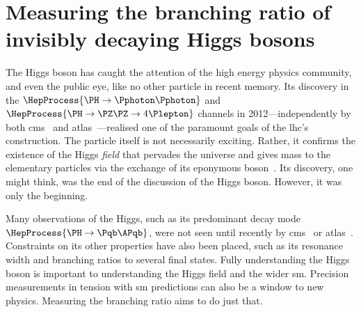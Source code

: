 \fi




\section{Measuring the branching ratio of invisibly decaying Higgs bosons}
\label{sec:theory_higgs_to_inv}

The Higgs boson has caught the attention of the high energy physics community, and even the public eye, like no other particle in recent memory. Its discovery in the $\HepProcess{\PH \to \Pphoton\Pphoton}$ and $\HepProcess{\PH \to \PZ\PZ \to \text{4}\Plepton}$ channels in 2012---independently by both \acrshort{cms}~\cite{Chatrchyan:2012xdj} and \acrshort{atlas}~\cite{Aad:2012tfa}---realised one of the paramount goals of the \acrshort{lhc}'s construction. The particle itself is not necessarily exciting. Rather, it confirms the existence of the Higgs \emph{field} that pervades the universe and gives mass to the elementary particles via the exchange of its eponymous boson~\cite{PhysRevLett.13.321,PhysRevLett.13.508,PhysRevLett.13.585}. Its discovery, one might think, was the end of the discussion of the Higgs boson. However, it was only the beginning.

Many observations of the Higgs, such as its predominant decay mode $\HepProcess{\PH \to \Pqb\APqb}$, were not seen until recently by \acrshort{cms}~\cite{Sirunyan:2018kst} or \acrshort{atlas}~\cite{Aaboud:2018zhk}. Constraints on its other properties have also been placed, such as its resonance width and branching ratios \BR to several final states. Fully understanding the Higgs boson is important to understanding the Higgs field and the wider \acrlong{sm}. Precision measurements in tension with \acrshort{sm} predictions can also be a window to new physics. Measuring the \higgstoinv branching ratio aims to do just that.

